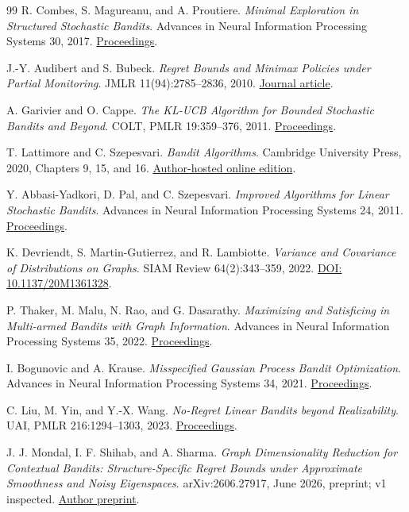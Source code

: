 \documentclass[11pt]{article}
\begin{document}
\begin{thebibliography}{99}
 R. Combes, S. Magureanu, and A. Proutiere.
\emph{Minimal Exploration in Structured Stochastic Bandits}.
Advances in Neural Information Processing Systems 30, 2017.
\href{https://papers.nips.cc/paper_files/paper/2017/hash/e19347e1c3ca0c0b97de5fb3b690855a-Abstract.html}{Proceedings}.

 J.-Y. Audibert and S. Bubeck.
\emph{Regret Bounds and Minimax Policies under Partial Monitoring}.
JMLR 11(94):2785--2836, 2010.
\href{https://www.jmlr.org/papers/v11/audibert10a.html}{Journal article}.

 A. Garivier and O. Cappe.
\emph{The KL-UCB Algorithm for Bounded Stochastic Bandits and Beyond}.
COLT, PMLR 19:359--376, 2011.
\href{https://proceedings.mlr.press/v19/garivier11a.html}{Proceedings}.

 T. Lattimore and C. Szepesvari.
\emph{Bandit Algorithms}.
Cambridge University Press, 2020, Chapters 9, 15, and 16.
\href{https://tor-lattimore.com/downloads/book/book.pdf}{Author-hosted online edition}.

 Y. Abbasi-Yadkori, D. Pal, and C. Szepesvari.
\emph{Improved Algorithms for Linear Stochastic Bandits}.
Advances in Neural Information Processing Systems 24, 2011.
\href{https://proceedings.neurips.cc/paper_files/paper/2011/hash/e1d5be1c7f2f456670de3d53c7b54f4a-Abstract.html}{Proceedings}.

 K. Devriendt, S. Martin-Gutierrez, and R. Lambiotte.
\emph{Variance and Covariance of Distributions on Graphs}.
SIAM Review 64(2):343--359, 2022.
\href{https://doi.org/10.1137/20M1361328}{DOI: 10.1137/20M1361328}.

 P. Thaker, M. Malu, N. Rao, and G. Dasarathy.
\emph{Maximizing and Satisficing in Multi-armed Bandits with Graph Information}.
Advances in Neural Information Processing Systems 35, 2022.
\href{https://papers.neurips.cc/paper_files/paper/2022/hash/0d561979f0f4bc6127cfcfe9c46ee205-Abstract-Conference.html}{Proceedings}.

 I. Bogunovic and A. Krause.
\emph{Misspecified Gaussian Process Bandit Optimization}.
Advances in Neural Information Processing Systems 34, 2021.
\href{https://papers.neurips.cc/paper_files/paper/2021/hash/177db6acfe388526a4c7bff88e1feb15-Abstract.html}{Proceedings}.

 C. Liu, M. Yin, and Y.-X. Wang.
\emph{No-Regret Linear Bandits beyond Realizability}.
UAI, PMLR 216:1294--1303, 2023.
\href{https://proceedings.mlr.press/v216/liu23c.html}{Proceedings}.

 J. J. Mondal, I. F. Shihab, and A. Sharma.
\emph{Graph Dimensionality Reduction for Contextual Bandits:
Structure-Specific Regret Bounds under Approximate Smoothness and Noisy Eigenspaces}.
arXiv:2606.27917, June 2026, preprint; v1 inspected.
\href{https://arxiv.org/html/2606.27917v1}{Author preprint}.

\end{thebibliography}
\end{document}
